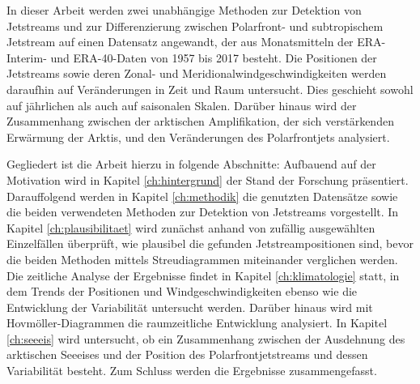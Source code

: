 In dieser Arbeit werden zwei unabhängige Methoden zur Detektion von Jetstreams und zur Differenzierung zwischen Polarfront- und subtropischem Jetstream auf einen Datensatz angewandt, der aus Monatsmitteln der ERA-Interim- und ERA-40-Daten von 1957 bis 2017 besteht. Die Positionen der Jetstreams sowie deren Zonal- und Meridionalwindgeschwindigkeiten werden daraufhin auf Veränderungen in Zeit und Raum untersucht. Dies geschieht sowohl auf jährlichen als auch auf saisonalen Skalen. Darüber hinaus wird der Zusammenhang zwischen der arktischen Amplifikation, der sich verstärkenden Erwärmung der Arktis, und den Veränderungen des Polarfrontjets analysiert.

Gegliedert ist die Arbeit hierzu in folgende Abschnitte: Aufbauend auf der Motivation wird in Kapitel \ref{ch:hintergrund} der Stand der Forschung präsentiert. Darauffolgend werden in Kapitel \ref{ch:methodik} die genutzten Datensätze sowie die beiden verwendeten Methoden zur Detektion von Jetstreams vorgestellt. In Kapitel \ref{ch:plausibilitaet} wird zunächst anhand von zufällig ausgewählten Einzelfällen überprüft, wie plausibel die gefunden Jetstream\-positionen sind, bevor die beiden Methoden mittels Streudiagrammen miteinander verglichen werden. Die zeitliche Analyse der Ergebnisse findet in Kapitel \ref{ch:klimatologie} statt, in dem Trends der Positionen und Windgeschwindigkeiten ebenso wie die Entwicklung der Variabilität untersucht werden. Darüber hinaus wird mit Hovmöller-Diagrammen die raumzeitliche Entwicklung analysiert. In Kapitel \ref{ch:seeeis} wird untersucht, ob ein Zusammenhang zwischen der Ausdehnung des arktischen Seeeises und der Position des Polarfrontjetstreams und dessen Variabilität besteht. Zum Schluss werden die Ergebnisse zusammengefasst.
